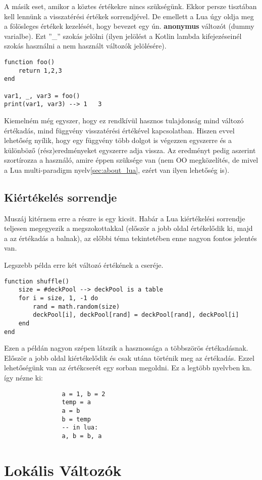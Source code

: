 A másik eset, amikor a köztes értékekre nincs szükségünk. Ekkor persze tisztában kell lennünk a visszatérési értékek sorrendjével. De emellett a Lua úgy oldja meg a fölösleges értékek kezelését, hogy bevezet egy ún. \textbf{anonymus} változót (dummy varialbe). Ezt ''\_'' szokás jelölni (ilyen jelölést a Kotlin lambda kifejezéseinél szokás használni a nem használt változók jelölésére).
\scriptsize
\begin{lstlisting}
function foo()
	return 1,2,3
end

var1, _, var3 = foo()
print(var1, var3) --> 1   3
\end{lstlisting}
\normalsize
Kiemelném még egyszer, hogy ez rendkívül hasznos tulajdonság mind változó értékadás, mind függvény visszatérési értékével kapcsolatban. Hiszen evvel lehetőség nyílik, hogy egy függvény több dolgot is végezzen egyszerre és a különböző (rész)eredményeket egyszerre adja vissza. Az eredményt pedig aszerint szortírozza a használó, amire éppen szüksége van (nem OO megközelítés, de mivel a Lua multi-paradigm nyelv\ref{sec:about_lua}, ezért van ilyen lehetőség is).

\subsection{Kiértékelés sorrendje}

Muszáj kitérnem erre a részre is egy kicsit. Habár a Lua kiértékelési sorrendje teljesen megegyezik a megszokottakkal (először a jobb oldal értékelődik ki, majd a az értékadás a balnak), az előbbi téma tekintetében enne nagyon fontos jelentés van.

Legszebb példa erre két változó értékének a cseréje.
\scriptsize
\begin{lstlisting}
function shuffle()
	size = #deckPool --> deckPool is a table 
	for i = size, 1, -1 do
		rand = math.random(size)
		deckPool[i], deckPool[rand] = deckPool[rand], deckPool[i]
	end
end
\end{lstlisting}
\normalsize
\newpage
Ezen a példán nagyon szépen látszik a hasznossága a többszörös értékadásnak. Először a jobb oldal kiértékelődik és csak utána történik meg az értékadás. Ezzel lehetőségünk van az értékcserét egy sorban megoldni. Ez a legtöbb nyelvben kn. így nézne ki:
\scriptsize
\begin{lstlisting}
				a = 1, b = 2
				temp = a
				a = b
				b = temp
				-- in lua:
				a, b = b, a
\end{lstlisting}
\normalsize

\section{Lokális Változók}
\label{sec:l_lovalV}

